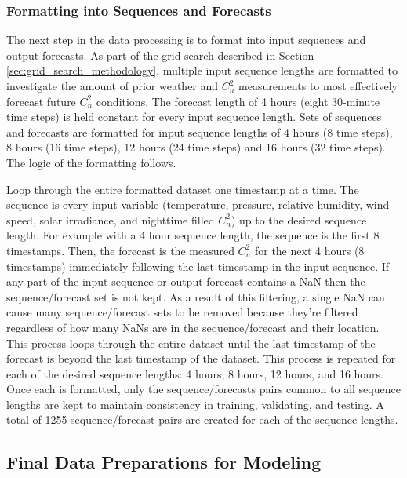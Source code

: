 \subsubsection{Formatting into Sequences and Forecasts}
The next step in the data processing is to format into input sequences and output forecasts. As part of the grid search described in Section \ref{sec:grid_search_methodology}, multiple input sequence lengths are formatted to investigate the amount of prior weather and $C_{n}^{2}$ measurements to most effectively forecast future $C_{n}^{2}$ conditions. The forecast length of 4 hours (eight 30-minute time steps) is held constant for every input sequence length. Sets of sequences and forecasts are formatted for input sequence lengths of 4 hours (8 time steps), 8 hours (16 time steps), 12 hours (24 time steps) and 16 hours (32 time steps). The logic of the formatting follows.

Loop through the entire formatted dataset one timestamp at a time. The sequence is every input variable (temperature, pressure, relative humidity, wind speed, solar irradiance, and nighttime filled $C_{n}^{2}$) up to the desired sequence length. For example with a 4 hour sequence length, the sequence is the first 8 timestamps. Then, the forecast is the measured $C_{n}^{2}$ for the next 4 hours (8 timestamps) immediately following the last timestamp in the input sequence. If any part of the input sequence or output forecast contains a NaN then the sequence/forecast set is not kept. As a result of this filtering, a single NaN can cause many sequence/forecast sets to be removed because they're filtered regardless of how many NaNs are in the sequence/forecast and their location. This process loops through the entire dataset until the last timestamp of the forecast is beyond the last timestamp of the dataset. This process is repeated for each of the desired sequence lengths: 4 hours, 8 hours, 12 hours, and 16 hours. Once each is formatted, only the sequence/forecasts pairs common to all sequence lengths are kept to maintain consistency in training, validating, and testing. A total of 1255 sequence/forecast pairs are created for each of the sequence lengths.

\subsection{Final Data Preparations for Modeling}

